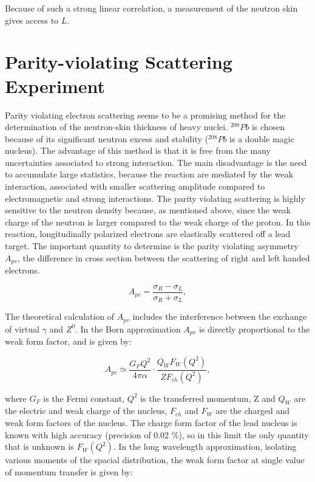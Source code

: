 Because of such a strong linear correlation, a measurement of the neutron skin gives access to $L$. 
  
\section{Parity-violating Scattering Experiment}

Parity violating electron scattering seems to be a promising method for the determination of the neutron-skin thickness of heavy nuclei. $^{208}Pb$ is chosen because of its significant neutron excess and stability 
($^{208}Pb$ is a double magic nucleus). The advantage of this method is that it is free from the many uncertainties associated to strong interaction. The main disadvantage is the need to accumulate large statistics, because the reaction are mediated by the weak interaction, associated with smaller scattering amplitude compared to electromagnetic and strong interactions. 
The parity violating scattering is highly sensitive to the neutron density because, as mentioned above, since the weak charge of the neutron is larger compared to the weak charge of the proton.
In this reaction, longitudinally polarized electrons are elastically scattered off a lead target. The important quantity to determine is the parity violating asymmetry $A_{pv}$, the difference in cross section between the scattering of right and left handed electrons. 

\begin{equation}
A_{pv} = \dfrac{\sigma_{R} - \sigma_{L}}{\sigma_{R} + \sigma_{L}} ,
\end{equation} 

The theoretical calculation of $A_{pv}$ includes the interference between the exchange of virtual $\gamma$ and $Z^{0}$. In the Born approximation $A_{pv}$ is directly proportional to the weak form factor, and is given by:

\begin{equation} \label{eq:BornLimit}
A_{pv} \simeq \dfrac{G_{F} Q^{2}}{4 \pi \alpha} \cdot \dfrac{Q_{W} F_{W}(Q^{2})}{Z F_{ch}(Q^{2})} ,
\end{equation} 

where $G_{F}$ is the Fermi constant, $Q^{2}$ is the transferred momentum, Z and $Q_{W}$ are the electric and weak charge of the nucleus, $F_{ch}$ and $F_{W}$ are the charged and weak form factors of the nucleus. The charge form factor of the lead nucleus is known with high accuracy (precision of 0.02 \%), so in this limit the only quantity that is unknown is $F_{W}(Q^{2})$. In the long wavelength approximation, isolating various moments of the spacial distribution, the weak form factor at single value of momentum transfer is given by:

